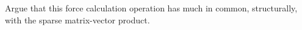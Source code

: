   Argue that this force calculation operation has much in common,
  structurally, with the sparse matrix-vector product.
